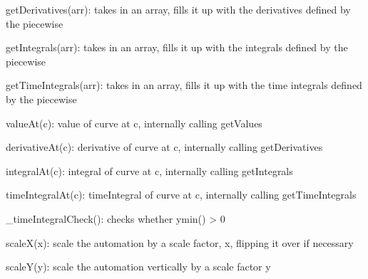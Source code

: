 \documentclass{article}
\begin{document}
getDerivatives(arr): takes in an array, fills it up with the derivatives defined by the piecewise

getIntegrals(arr): takes in an array, fills it up with the integrals defined by the piecewise

getTimeIntegrals(arr): takes in an array, fills it up with the time integrals defined by the piecewise 

valueAt(c): value of curve at c, internally calling getValues

derivativeAt(c): derivative of curve at c, internally calling getDerivatives

integralAt(c): integral of curve at c, internally calling getIntegrals

timeIntegralAt(c): timeIntegral of curve at c, internally calling getTimeIntegrals

\_timeIntegralCheck(): checks whether ymin() > 0

scaleX(x): scale the automation by a scale factor, x, flipping it over if necessary

scaleY(y): scale the automation vertically by a scale factor y
\end{document}
